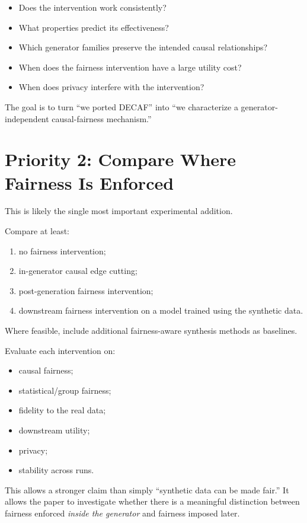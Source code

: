 \documentclass[11pt]{article}
\begin{document}
\begin{itemize}
    \item Does the intervention work consistently?
    \item What properties predict its effectiveness?
    \item Which generator families preserve the intended causal relationships?
    \item When does the fairness intervention have a large utility cost?
    \item When does privacy interfere with the intervention?
\end{itemize}

The goal is to turn ``we ported DECAF'' into ``we characterize a generator-independent causal-fairness mechanism.''

\section*{Priority 2: Compare Where Fairness Is Enforced}

This is likely the single most important experimental addition.

Compare at least:

\begin{enumerate}
    \item no fairness intervention;
    \item in-generator causal edge cutting;
    \item post-generation fairness intervention;
    \item downstream fairness intervention on a model trained using the synthetic data.
\end{enumerate}

Where feasible, include additional fairness-aware synthesis methods as baselines.

Evaluate each intervention on:

\begin{itemize}
    \item causal fairness;
    \item statistical/group fairness;
    \item fidelity to the real data;
    \item downstream utility;
    \item privacy;
    \item stability across runs.
\end{itemize}

This allows a stronger claim than simply ``synthetic data can be made fair.'' It allows the paper to investigate whether there is a meaningful distinction between fairness enforced \emph{inside the generator} and fairness imposed later.
\end{document}
